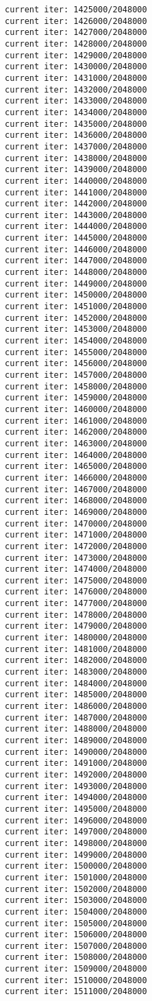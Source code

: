 \documentclass[11pt]{article}
\begin{document}
\begin{Verbatim}[commandchars=\\\{\}]
current iter: 1425000/2048000
current iter: 1426000/2048000
current iter: 1427000/2048000
current iter: 1428000/2048000
current iter: 1429000/2048000
current iter: 1430000/2048000
current iter: 1431000/2048000
current iter: 1432000/2048000
current iter: 1433000/2048000
current iter: 1434000/2048000
current iter: 1435000/2048000
current iter: 1436000/2048000
current iter: 1437000/2048000
current iter: 1438000/2048000
current iter: 1439000/2048000
current iter: 1440000/2048000
current iter: 1441000/2048000
current iter: 1442000/2048000
current iter: 1443000/2048000
current iter: 1444000/2048000
current iter: 1445000/2048000
current iter: 1446000/2048000
current iter: 1447000/2048000
current iter: 1448000/2048000
current iter: 1449000/2048000
current iter: 1450000/2048000
current iter: 1451000/2048000
current iter: 1452000/2048000
current iter: 1453000/2048000
current iter: 1454000/2048000
current iter: 1455000/2048000
current iter: 1456000/2048000
current iter: 1457000/2048000
current iter: 1458000/2048000
current iter: 1459000/2048000
current iter: 1460000/2048000
current iter: 1461000/2048000
current iter: 1462000/2048000
current iter: 1463000/2048000
current iter: 1464000/2048000
current iter: 1465000/2048000
current iter: 1466000/2048000
current iter: 1467000/2048000
current iter: 1468000/2048000
current iter: 1469000/2048000
current iter: 1470000/2048000
current iter: 1471000/2048000
current iter: 1472000/2048000
current iter: 1473000/2048000
current iter: 1474000/2048000
current iter: 1475000/2048000
current iter: 1476000/2048000
current iter: 1477000/2048000
current iter: 1478000/2048000
current iter: 1479000/2048000
current iter: 1480000/2048000
current iter: 1481000/2048000
current iter: 1482000/2048000
current iter: 1483000/2048000
current iter: 1484000/2048000
current iter: 1485000/2048000
current iter: 1486000/2048000
current iter: 1487000/2048000
current iter: 1488000/2048000
current iter: 1489000/2048000
current iter: 1490000/2048000
current iter: 1491000/2048000
current iter: 1492000/2048000
current iter: 1493000/2048000
current iter: 1494000/2048000
current iter: 1495000/2048000
current iter: 1496000/2048000
current iter: 1497000/2048000
current iter: 1498000/2048000
current iter: 1499000/2048000
current iter: 1500000/2048000
current iter: 1501000/2048000
current iter: 1502000/2048000
current iter: 1503000/2048000
current iter: 1504000/2048000
current iter: 1505000/2048000
current iter: 1506000/2048000
current iter: 1507000/2048000
current iter: 1508000/2048000
current iter: 1509000/2048000
current iter: 1510000/2048000
current iter: 1511000/2048000

\end{Verbatim}
\end{document}
